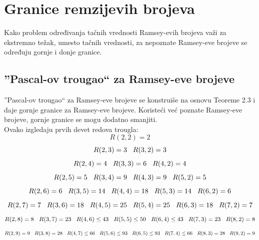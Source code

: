 \documentclass[12pt,a4paper]{article}
\begin{document}
	\section{Granice remzijevih brojeva}
	Kako problem određivanja tačnih vrednosti Ramsey-evih brojeva važi za ekstremno težak, umesto tačnih vrednosti, za nepoznate Ramsey-eve brojeve se određuju gornje i donje granice.
	\subsection{''Pascal-ov trougao`` za  Ramsey-eve brojeve}
	''Pascal-ov trougao`` za  Ramsey-eve brojeve se konstruiše na osnovu Teoreme 2.3 i daje gornje granice za Ramsey-eve brojeve. Koristeći već poznate Ramsey-eve brojeve, gornje granice se mogu dodatno smanjiti.\\
	\vspace{0.2em}
	\noindent Ovako izgledaju prvih devet redova trougla:
	\vspace{2em}
	\tiny 
\[R(2,2)=2\]
\[R(2,3)=3\hspace{0.3cm}R(3,2)=3\]
\[R(2,4)=4\hspace{0.3cm}R(3,3)=6\hspace{0.3cm}R(4,2)=4\]
\[R(2,5)=5\hspace{0.3cm}R(3,4)=9\hspace{0.3cm}R(4,3)=9\hspace{0.3cm}R(5,2)=5\]
\[R(2,6)=6\hspace{0.3cm}R(3,5)=14\hspace{0.3cm}R(4,4)=18\hspace{0.3cm}R(5,3)=14\hspace{0.3cm}R(6,2)=6\]
\[R(2,7)=7\hspace{0.3cm}R(3,6)=18\hspace{0.3cm}R(4,5)=25\hspace{0.3cm}R(5,4)=25\hspace{0.3cm}R(6,3)=18\hspace{0.3cm}R(7,2)=7\]
\[R(2,8)=8\hspace{0.3cm}R(3,7)=23\hspace{0.3cm}R(4,6)\leq 43\hspace{0.3cm}R(5,5)\leq 50\hspace{0.3cm}R(6,4)\leq 43\hspace{0.3cm}R(7,3)=23\hspace{0.3cm}R(8,2)=8\]
\[R(2,9)=9\hspace{0.3cm}R(3,8)=28\hspace{0.3cm}R(4,7)\leq 66\hspace{0.3cm}R(5,6)\leq 93\hspace{0.3cm}R(6,5)\leq 93\hspace{0.3cm}R(7,4)\leq 66\hspace{0.3cm}R(8,3)=28\hspace{0.3cm}R(9,2)=9\]
\end{document}

